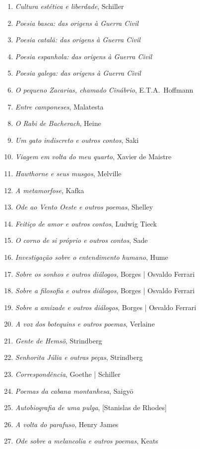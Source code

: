 \begin{enumerate}
\item \textit{Cultura estética e liberdade}, Schiller
\item \textit{Poesia basca: das origens à Guerra Civil} 
\item \textit{Poesia catalã: das origens à Guerra Civil} 
\item \textit{Poesia espanhola: das origens à Guerra Civil} 
\item \textit{Poesia galega: das origens à Guerra Civil} 
\item \textit{O pequeno Zacarias, chamado Cinábrio}, E.T.A.~Hoffmann
\item \textit{Entre camponeses}, Malatesta
\item \textit{O Rabi de Bacherach}, Heine
\item \textit{Um gato indiscreto e outros contos}, Saki
\item \textit{Viagem em volta do meu quarto}, Xavier de Maistre 
\item \textit{Hawthorne e seus musgos}, Melville
\item \textit{A metamorfose}, Kafka
\item \textit{Ode ao Vento Oeste e outros poemas}, Shelley
\item \textit{Feitiço de amor e outros contos}, Ludwig Tieck
\item \textit{O corno de si próprio e outros contos}, Sade
\item \textit{Investigação sobre o entendimento humano}, Hume
\item \textit{Sobre os sonhos e outros diálogos}, Borges | Osvaldo Ferrari
\item \textit{Sobre a filosofia e outros diálogos}, Borges | Osvaldo Ferrari
\item \textit{Sobre a amizade e outros diálogos}, Borges | Osvaldo Ferrari
\item \textit{A voz dos botequins e outros poemas}, Verlaine 
\item \textit{Gente de Hemsö}, Strindberg 
\item \textit{Senhorita Júlia e outras peças}, Strindberg 
\item \textit{Correspondência}, Goethe | Schiller
\item \textit{Poemas da cabana montanhesa}, Saigy\=o
\item \textit{Autobiografia de uma pulga}, [Stanislas de Rhodes]
\item \textit{A volta do parafuso}, Henry James
\item \textit{Ode sobre a melancolia e outros poemas}, Keats 

\end{enumerate}
